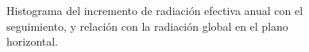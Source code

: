 \begin{figure}
  \begin{centering}
    \par\end{centering}

  \begin{centering}
    \par\end{centering}
    
  \caption[Relación con radiación]{Histograma del incremento de radiación efectiva
    anual con el seguimiento, y relación con la radiación global en el plano horizontal.}
  \label{fig:HistComparativaRadiación}
\end{figure}



